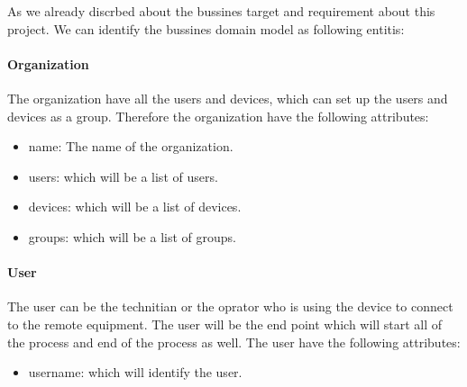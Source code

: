 


As we already discrbed about the bussines target and requirement 
about this project. We can identify the bussines domain model as following
entitis:

\paragraph{Organization}
The organization have all the users and devices, which can set up the users and devices as a group.
Therefore the organization have the following attributes:
\begin{itemize}
    \item name: The name of the organization.
    \item users: which will be a list of users.
    \item devices: which will be a list of devices.
    \item groups: which will be a list of groups.
\end{itemize}

\paragraph{User}
The user can be the technitian or the oprator who is using the device to connect
to the remote equipment. The user will be the end point which will start all of the process and end of the process as well.
The user have the following attributes:
\begin{itemize}
    \item username: which will identify the user.
\end{itemize}


